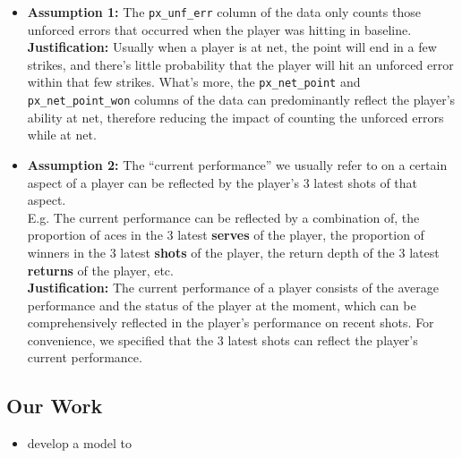 \begin{itemize}
    \item \textbf{Assumption 1:} The \verb|px_unf_err| column of the data only counts those unforced errors that occurred when the player was hitting in baseline.\\
    \textbf{Justification:} Usually when a player is at net, the point will end in a few strikes, and there's little probability that the player will hit an unforced error within that few strikes. What's more, the \verb|px_net_point| and \verb|px_net_point_won| columns of the data can predominantly reflect the player's ability at net, therefore reducing the impact of counting the unforced errors while at net.
    
    \item \textbf{Assumption 2:} The ``current performance'' we usually refer to on a certain aspect of a player can be reflected by the player's 3 latest shots of that aspect.\\
    E.g. The current performance can be reflected by a combination of, the proportion of aces in the 3 latest \textbf{serves} of the player, the proportion of winners in the 3 latest \textbf{shots} of the player, the return depth of the 3 latest \textbf{returns} of the player, etc. \\
    \textbf{Justification:} The current performance of a player consists of the average performance and the status of the player at the moment, which can be comprehensively reflected in the player's performance on recent shots. For convenience, we specified that the 3 latest shots can reflect the player's current performance.
\end{itemize}

\subsection{Our Work}

\begin{itemize}
    \item develop a model to 
\end{itemize}
